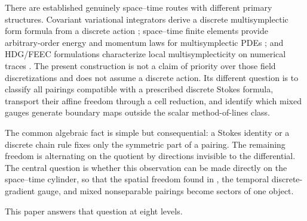 \documentclass[11pt,a4paper]{article}
\begin{document}
There are established genuinely space--time routes with different primary
structures.  Covariant variational integrators derive a discrete
multisymplectic form formula from a discrete action
\cite{marsden1998}; space--time finite elements provide arbitrary-order
energy and momentum laws for multisymplectic PDEs
\cite{celledoni2021}; and HDG/FEEC formulations characterize local
multisymplecticity on numerical traces
\cite{mclachlan2020,stern2026,sternzampa2026}.  The present construction is
not a claim of priority over those field discretizations and does not
assume a discrete action.  Its different question is to classify all
pairings compatible with a prescribed discrete Stokes formula, transport
their affine freedom through a cell reduction, and identify which mixed
gauges generate boundary maps outside the scalar method-of-lines class.

The common algebraic fact is simple but consequential: a Stokes identity
or a discrete chain rule fixes only the symmetric part of a pairing.  The
remaining freedom is alternating on the quotient by directions invisible
to the differential.  The central question is whether this observation
can be made directly on the space--time cylinder, so that the spatial
freedom found in \cite{moulla2012}, the temporal discrete-gradient gauge,
and mixed nonseparable pairings become sectors of one object.

This paper answers that question at eight levels.
\end{document}
